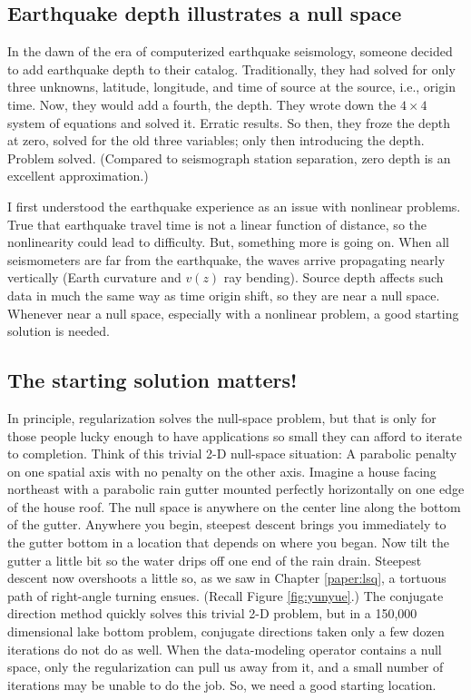 \subsection{Earthquake depth illustrates a null space}
 
In the dawn of the era of computerized earthquake seismology,
someone decided to add earthquake depth to their catalog.
Traditionally, they had solved for only three unknowns,
latitude, longitude, and time of source at the source, i.e., origin time.
Now,
they would add a fourth, the depth.
They wrote down the $4\times 4$ system of equations and solved it.
Erratic results.
So then,
they froze the depth at zero,
solved for the old three variables;
only then introducing the depth.
Problem solved.
(Compared to seismograph station separation, zero depth is an excellent approximation.)

I first understood the earthquake experience
as an issue with nonlinear problems.
True that earthquake travel time is not a linear function of distance,
so the nonlinearity could lead to difficulty.
But,
something more is going on.
When all seismometers are far from the earthquake,
the waves arrive propagating nearly vertically (Earth curvature and $v(z)$ ray bending).
Source depth affects such data in much the same way as time origin shift,
so they are near a null space.
Whenever near a null space,
especially with a nonlinear problem,
a good starting solution is needed.


\subsection{The starting solution matters!}
In principle, regularization solves the null-space problem,
but that is only for those people lucky enough to have applications
so small they can afford to iterate to completion.
Think of this trivial 2-D null-space situation:
A parabolic penalty on one spatial axis
with no penalty on the other axis.
Imagine a house facing northeast with a parabolic rain gutter mounted perfectly
horizontally on one edge of the house roof.
The null space is anywhere on the center line along the bottom of the gutter.
Anywhere you begin, steepest descent brings you immediately to the gutter bottom
in a location that depends on where you began.
Now tilt the gutter a little bit so the water drips off one end of the rain drain.
Steepest descent now overshoots a little so,
as we saw in Chapter \ref{paper:lsq},
a tortuous path of right-angle turning ensues.
(Recall Figure \ref{fig:yunyue}.)
The conjugate direction method quickly solves this trivial 2-D problem,
but in a 150,000 dimensional lake bottom problem,
conjugate directions taken only a few dozen iterations do not do as well.
When the data-modeling operator contains a null space,
only the regularization can pull us away from it,
and a small number of iterations may be unable to do the job.
So,
we need a good starting location.
\par

